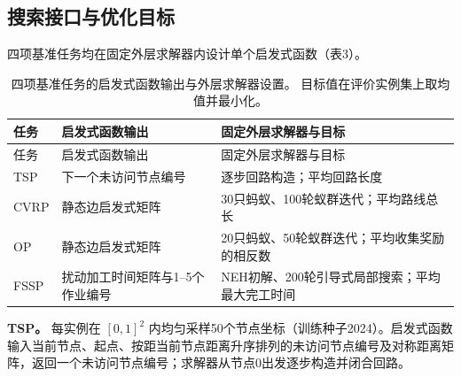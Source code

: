 \documentclass{article}
\begin{document}
\subsection{搜索接口与优化目标}\label{ux641cux7d22ux63a5ux53e3ux4e0eux4f18ux5316ux76eeux6807}

四项基准任务均在固定外层求解器内设计单个启发式函数（表3）。

\begin{longtable}[]{@{}
  >{\raggedright\arraybackslash}p{}
  >{\raggedright\arraybackslash}p{}
  >{\raggedright\arraybackslash}p{}@{}}
\caption{四项基准任务的启发式函数输出与外层求解器设置。 目标值在评价实例集上取均值并最小化。}\tabularnewline
\toprule\noalign{}
\begin{minipage}[b]{\linewidth}\raggedright
任务
\end{minipage} & \begin{minipage}[b]{\linewidth}\raggedright
启发式函数输出
\end{minipage} & \begin{minipage}[b]{\linewidth}\raggedright
固定外层求解器与目标
\end{minipage} \\
\midrule\noalign{}
\endfirsthead
\toprule\noalign{}
\begin{minipage}[b]{\linewidth}\raggedright
任务
\end{minipage} & \begin{minipage}[b]{\linewidth}\raggedright
启发式函数输出
\end{minipage} & \begin{minipage}[b]{\linewidth}\raggedright
固定外层求解器与目标
\end{minipage} \\
\midrule\noalign{}
\endhead
\bottomrule\noalign{}
\endlastfoot
TSP & 下一个未访问节点编号 & 逐步回路构造；平均回路长度 \\
CVRP & 静态边启发式矩阵 & 30只蚂蚁、100轮蚁群迭代；平均路线总长 \\
OP & 静态边启发式矩阵 & 20只蚂蚁、50轮蚁群迭代；平均收集奖励的相反数 \\
FSSP & 扰动加工时间矩阵与1--5个作业编号 & NEH初解、200轮引导式局部搜索；平均最大完工时间 \\
\end{longtable}

\textbf{TSP。} 每实例在 \([0,1]^2\) 内均匀采样50个节点坐标（训练种子2024）。启发式函数输入当前节点、起点、按距当前节点距离升序排列的未访问节点编号及对称距离矩阵，返回一个未访问节点编号；求解器从节点0出发逐步构造并闭合回路。
\end{document}
